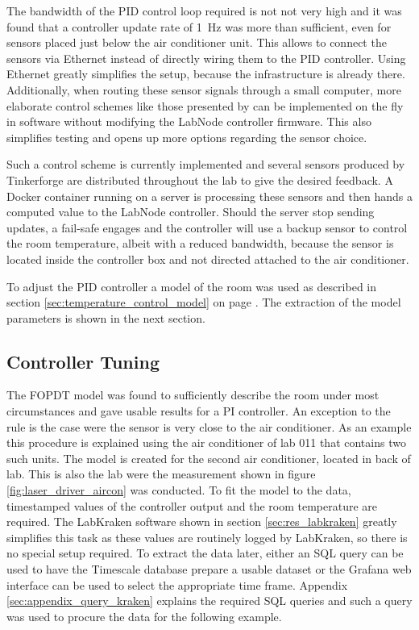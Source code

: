 The bandwidth of the PID control loop required is not not very high and it was found that a controller update rate of \qty{1}{\Hz} was more than sufficient, even for sensors placed just below the air conditioner unit. This allows to connect the sensors via Ethernet instead of directly wiring them to the PID controller. Using Ethernet greatly simplifies the setup, because the infrastructure is already there. Additionally, when routing these sensor signals through a small computer, more elaborate control schemes like those presented by \citeauthor{split_pid} \cite{split_pid} can be implemented on the fly in software without modifying the LabNode controller firmware. This also simplifies testing and opens up more options regarding the sensor choice.

Such a control scheme is currently implemented and several sensors produced by Tinkerforge are distributed throughout the lab to give the desired feedback. A Docker container running on a server is processing these sensors and then hands a computed value to the LabNode controller. Should the server stop sending updates, a fail-safe engages and the controller will use a backup sensor to control the room temperature, albeit with a reduced bandwidth, because the sensor is located inside the controller box and not directed attached to the air conditioner.

To adjust the PID controller a model of the room was used as described in section \ref{sec:temperature_control_model} on page \pageref{sec:temperature_control_model}. The extraction of the model parameters is shown in the next section.

\subsection{Controller Tuning}%
\label{sec:pid_controller_tuning}
The FOPDT model was found to sufficiently describe the room under most circumstances and gave usable results for a PI controller. An exception to the rule is the case were the sensor is very close to the air conditioner. As an example this procedure is explained using the air conditioner of lab 011 that contains two such units. The model is created for the second air conditioner, located in back of lab. This is also the lab were the measurement shown in figure \ref{fig:laser_driver_aircon} was conducted. To fit the model to the data, timestamped values of the controller output and the room temperature are required. The LabKraken software shown in section \ref{sec:res_labkraken} greatly simplifies this task as these values are routinely logged by LabKraken, so there is no special setup required. To extract the data later, either an SQL query can be used to have the Timescale database prepare a usable dataset or the Grafana web interface can be used to select the appropriate time frame. Appendix \ref{sec:appendix_query_kraken} explains the required SQL queries and such a query was used to procure the data for the following example.

